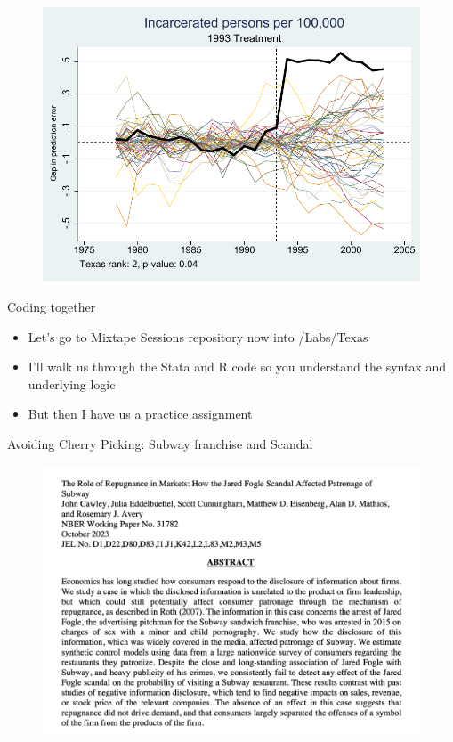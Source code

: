 \documentclass{beamer}
\begin{document}
\begin{frame}[shrink=30,plain]

\begin{figure}
\includegraphics{./lecture_includes/synth_placebo_totalincarceration1993.pdf}
\end{figure}
\end{frame}


\begin{frame}{Coding together}

\begin{itemize}
\item Let's go to Mixtape Sessions repository now into /Labs/Texas 
\item I'll walk us through the Stata and R code so you understand the syntax and underlying logic
\item But then I have us a practice assignment 
\end{itemize}

\end{frame}


\begin{frame}{Avoiding Cherry Picking: Subway franchise and Scandal}

	\begin{figure}
	\includegraphics[scale=0.25]{./lecture_includes/subway_8.png}
	\end{figure}

\end{frame}
\end{document}
